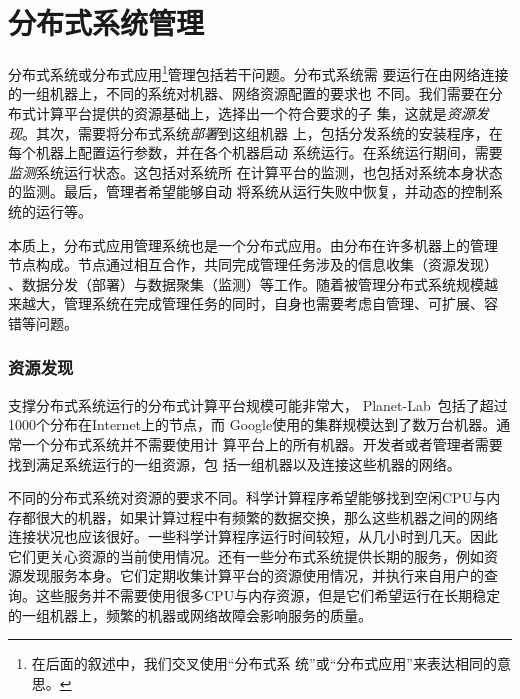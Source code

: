 % 
% 
% 
% 
% 

\section{分布式系统管理}
\label{sec:intro_mgmt}

分布式系统或分布式应用\footnote{在后面的叙述中，我们交叉使用“分布式系
统”或“分布式应用”来表达相同的意思。}管理包括若干问题。分布式系统需
要运行在由网络连接的一组机器上，不同的系统对机器、网络资源配置的要求也
不同。我们需要在分布式计算平台提供的资源基础上，选择出一个符合要求的子
集，这就是\emph{资源发现}。其次，需要将分布式系统\emph{部署}到这组机器
上，包括分发系统的安装程序，在每个机器上配置运行参数，并在各个机器启动
系统运行。在系统运行期间，需要\emph{监测}系统运行状态。这包括对系统所
在计算平台的监测，也包括对系统本身状态的监测。最后，管理者希望能够自动
将系统从运行失败中恢复，并动态的控制系统的运行等。

本质上，分布式应用管理系统也是一个分布式应用。由分布在许多机器上的管理
节点构成。节点通过相互合作，共同完成管理任务涉及的信息收集（资源发现）
、数据分发（部署）与数据聚集（监测）等工作。随着被管理分布式系统规模越
来越大，管理系统在完成管理任务的同时，自身也需要考虑自管理、可扩展、容
错等问题。

\subsubsection*{资源发现}

支撑分布式系统运行的分布式计算平台规模可能非常大，
Planet-Lab~\cite{Bavier2004}包括了超过1000个分布在Internet上的节点，而
Google使用的集群规模达到了数万台机器。通常一个分布式系统并不需要使用计
算平台上的所有机器。开发者或者管理者需要找到满足系统运行的一组资源，包
括一组机器以及连接这些机器的网络。

不同的分布式系统对资源的要求不同。科学计算程序希望能够找到空闲CPU与内
存都很大的机器，如果计算过程中有频繁的数据交换，那么这些机器之间的网络
连接状况也应该很好。一些科学计算程序运行时间较短，从几小时到几天。因此
它们更关心资源的当前使用情况。还有一些分布式系统提供长期的服务，例如资
源发现服务本身。它们定期收集计算平台的资源使用情况，并执行来自用户的查
询。这些服务并不需要使用很多CPU与内存资源，但是它们希望运行在长期稳定
的一组机器上，频繁的机器或网络故障会影响服务的质量。

